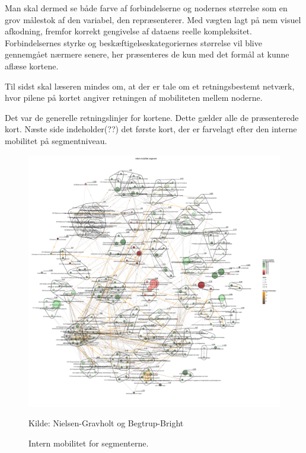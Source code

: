 Man skal dermed se både farve af forbindelserne og nodernes størrelse som en grov målestok af den variabel, den repræsenterer. Med vægten lagt på nem visuel afkodning, fremfor korrekt gengivelse af dataens reelle kompleksitet. Forbindelsernes styrke og beskæftigelseskategoriernes størrelse vil blive gennemgået nærmere senere, her præsenteres de kun med det formål at kunne aflæse kortene.  

Til sidst skal læseren mindes om, at der er tale om et retningsbestemt netværk, hvor pilene på kortet angiver retningen af mobiliteten mellem noderne. 

Det var de generelle retningslinjer for kortene. Dette gælder alle de præsenterede kort. Næste side indeholder(??) det første kort, der er farvelagt efter den interne mobilitet på segmentniveau.


\begin{figure}[H]
\begin{center}
	\caption{Intern mobilitet for segmenterne.}
	\label{fig_analyse_deskriptivt_kort_intern_mob_seg}
	\includegraphics[width=1.0\textwidth]{fig/netvaerkskort/kort_intern_mob_seg.pdf}
	\centerline{ \tiny{Kilde: Nielsen-Gravholt og Begtrup-Bright}}
\end{center}
\end{figure}
\restoregeometry

